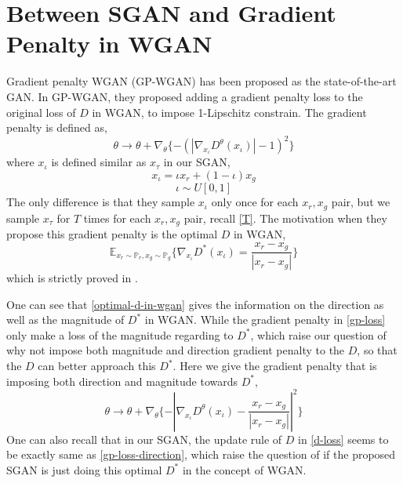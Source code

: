 \documentclass[letterpaper]{article} %
\begin{document}
\section{Between SGAN and Gradient Penalty in WGAN}

Gradient penalty WGAN (GP-WGAN) \cite{gulrajani2017improved} has been proposed as the state-of-the-art GAN. In GP-WGAN, they proposed adding a gradient penalty loss to the original loss of $D$ in WGAN, to impose 1-Lipschitz constrain. The gradient penalty is defined as,
\begin{equation}\label{gp-loss}
    \theta \longrightarrow \theta + \nabla_{\theta} \{ - (|\nabla_{x_{\iota}}D^{\theta}(x_{\iota})|-1)^2 \}
\end{equation}
where $x_\iota$ is defined similar as $x_\tau$ in our SGAN,
\begin{equation}\label{x-iota}
  x_{\iota} = \iota x_{r} + (1-\iota) x_g
\end{equation}
\begin{equation}\label{iota}
  \iota \sim U[0,1]
\end{equation}
The only difference is that they sample $x_\iota$ only once for each $x_r,x_g$ pair, but we sample $x_\tau$ for $T$ times for each $x_r,x_g$ pair, recall \eqref{T}.
The motivation when they propose this gradient penalty is the optimal $D$ in WGAN,
\begin{equation}\label{optimal-d-in-wgan}
  \mathbb{E}_{x_r\sim\mathbb{P}_r,x_g\sim\mathbb{P}_g} \{\nabla_{x_{\iota}}D^{\ast}(x_\iota)=\frac{x_r-x_g}{|x_r-x_g|}\}
\end{equation}
which is strictly proved in \cite{gulrajani2017improved}.

One can see that \eqref{optimal-d-in-wgan} gives the information on the direction as well as the magnitude of $D^{\ast}$ in WGAN.
While the gradient penalty in \eqref{gp-loss} only make a loss of the magnitude regarding to $D^{\ast}$, which raise our question of why not impose both magnitude and direction gradient penalty to the $D$, so that the $D$ can better approach this $D^{\ast}$.
Here we give the gradient penalty that is imposing both direction and magnitude towards $D^{\ast}$,
\begin{equation}\label{gp-loss-direction}
  \theta \longrightarrow \theta + \nabla_{\theta} \{ - |\nabla_{x_{\iota}}D^{\theta}(x_{\iota})-\frac{x_{r}-x_{g}}{|x_{r}-x_{g}|}|^2 \}
\end{equation}
One can also recall that in our SGAN, the update rule of $D$ in \eqref{d-loss} seems to be exactly same as \eqref{gp-loss-direction}, which raise the question of if the proposed SGAN is just doing this optimal $D^{\ast}$ in the concept of WGAN.
\end{document}
